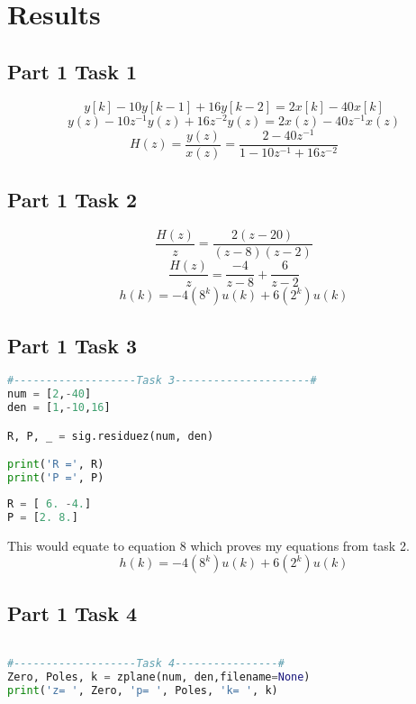 \documentclass[11pt,a4]{report}
\begin{document}
\section{Results}
\subsection{Part 1 Task 1}
\begin{equation}
    y[k]-10y[k-1]+16y[k-2]=2x[k]-40x[k]
\end{equation}
\begin{equation}
y(z)-10z^{-1}y(z)+16z^{-2}y(z)=2x(z)-40z^{-1}x(z)    
\end{equation}
\begin{equation}
    H(z)=\frac{y(z)}{x(z)}=\frac{2-40z^{-1}}{1-10z^{-1}+16z^{-2}}
\end{equation}
\subsection{Part 1 Task 2}
\begin{equation}
    \frac{H(z)}{z}=\frac{2(z-20)}{(z-8)(z-2)}
\end{equation}
\begin{equation}
    \frac{H(z)}{z}=\frac{-4}{z-8}+\frac{6}{z-2}
\end{equation}
\begin{equation}
    h(k)=-4(8^k)u(k)+6(2^k)u(k)
\end{equation}

\subsection{Part 1 Task 3}

\begin{lstlisting}[language=Python]
#-------------------Task 3---------------------#
num = [2,-40]
den = [1,-10,16]

R, P, _ = sig.residuez(num, den)

print('R =', R)
print('P =', P)
\end{lstlisting}

\begin{lstlisting}[language=Python]
R = [ 6. -4.]
P = [2. 8.]
\end{lstlisting}

This would equate to equation 8 which proves my equations from task 2. 
\begin{equation}
    h(k)=-4(8^k)u(k)+6(2^k)u(k)
\end{equation}
\subsection{Part 1 Task 4}
\begin{lstlisting}[language=Python]

#-------------------Task 4----------------#
Zero, Poles, k = zplane(num, den,filename=None)
print('z= ', Zero, 'p= ', Poles, 'k= ', k)

\end{lstlisting}
\end{document}
